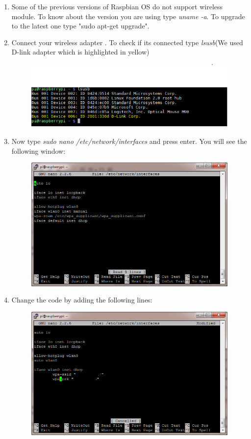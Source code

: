 \documentclass[11pt,a4paper]{article}
\begin{document}
\begin{enumerate}
\begin{figure}[h!]
			\centering
		\end{figure}
		\item Some of the previous versions of Raspbian OS do not support wireless module. To know about the version you are using type \textit{uname -a}. To upgrade to the latest one type "sudo apt-get upgrade".
		\item Connect your wireless adapter . To check if its connected type \textit{lsusb}(We used D-link adapter which is highlighted in yellow) 
		\begin{figure}[h!]
			\includegraphics[scale=0.6]{Lsusb.PNG}
			\centering
		\end{figure}
		\item Now type \textit{sudo nano /etc/network/interfaces} and press enter. You will see the following window:
		\newpage
		\begin{figure}[h!]
			\includegraphics[scale=0.6]{iwifi.png}
			\centering
		\end{figure}
		\item Change the code by adding the following lines:
		\begin{figure}[h!]
			\includegraphics[scale=0.6]{wificon.png}

\end{figure}
\end{enumerate}
\end{document}
